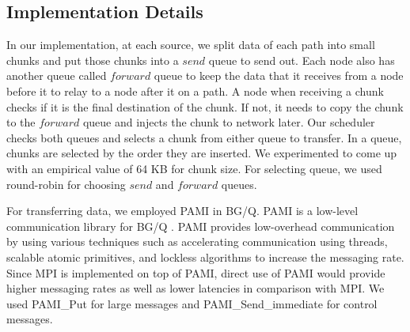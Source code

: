 \subsection{Implementation Details}

In our implementation, at each source, we split data of each path into small chunks and put those chunks into a $send$ queue to send out. Each node also has another queue called $forward$ queue to keep the data that it receives from a node before it to relay to a node after it on a path. A node when receiving a chunk checks if it is the final destination of the chunk. If not, it needs to copy the chunk to the $forward$ queue and injects the chunk to network later. Our scheduler checks both queues and selects a chunk from either queue to transfer. In a queue, chunks are selected by the order they are inserted. We experimented to come up with an empirical value of 64 KB for chunk size. For selecting queue, we used round-robin for choosing $send$ and $forward$ queues. 

For transferring data, we employed PAMI in BG/Q. PAMI is a low-level communication library for BG/Q \cite{PAMI:Kumar}. PAMI provides low-overhead communication by using various techniques such as accelerating communication using threads, scalable atomic primitives, and lockless algorithms to increase the messaging rate. Since MPI is implemented on top of PAMI, direct use of PAMI would provide higher messaging rates as well as lower latencies in comparison with MPI. We used PAMI\_Put for large messages and PAMI\_Send\_immediate for control messages.

